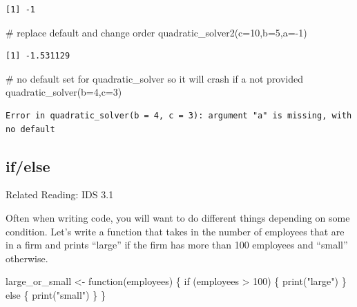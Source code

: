 \documentclass[
  letterpaper,
  DIV=11,
  numbers=noendperiod]{scrreprt}
\newenvironment{Shaded}{\begin{snugshade}}{\end{snugshade}}
\newcommand{\AttributeTok}[1]{\textcolor[rgb]{0.40,0.45,0.13}{#1}}
\newcommand{\CommentTok}[1]{\textcolor[rgb]{0.37,0.37,0.37}{#1}}
\newcommand{\ControlFlowTok}[1]{\textcolor[rgb]{0.00,0.23,0.31}{#1}}
\newcommand{\DecValTok}[1]{\textcolor[rgb]{0.68,0.00,0.00}{#1}}
\newcommand{\FunctionTok}[1]{\textcolor[rgb]{0.28,0.35,0.67}{#1}}
\newcommand{\NormalTok}[1]{\textcolor[rgb]{0.00,0.23,0.31}{#1}}
\newcommand{\OtherTok}[1]{\textcolor[rgb]{0.00,0.23,0.31}{#1}}
\newcommand{\SpecialCharTok}[1]{\textcolor[rgb]{0.37,0.37,0.37}{#1}}
\newcommand{\StringTok}[1]{\textcolor[rgb]{0.13,0.47,0.30}{#1}}
\begin{document}
\begin{verbatim}
[1] -1
\end{verbatim}

\begin{Shaded}
\begin{Highlighting}[]
\CommentTok{\# replace default and change order}
\FunctionTok{quadratic\_solver2}\NormalTok{(}\AttributeTok{c=}\DecValTok{10}\NormalTok{,}\AttributeTok{b=}\DecValTok{5}\NormalTok{,}\AttributeTok{a=}\SpecialCharTok{{-}}\DecValTok{1}\NormalTok{)}
\end{Highlighting}
\end{Shaded}

\begin{verbatim}
[1] -1.531129
\end{verbatim}

\begin{Shaded}
\begin{Highlighting}[]
\CommentTok{\# no default set for quadratic\_solver so it will crash if a not provided}
\FunctionTok{quadratic\_solver}\NormalTok{(}\AttributeTok{b=}\DecValTok{4}\NormalTok{,}\AttributeTok{c=}\DecValTok{3}\NormalTok{)}
\end{Highlighting}
\end{Shaded}

\begin{verbatim}
Error in quadratic_solver(b = 4, c = 3): argument "a" is missing, with no default
\end{verbatim}

\subsection{if/else}\label{ifelse}

Related Reading: IDS 3.1

Often when writing code, you will want to do different things depending
on some condition. Let's write a function that takes in the number of
employees that are in a firm and prints ``large'' if the firm has more
than 100 employees and ``small'' otherwise.

\begin{Shaded}
\begin{Highlighting}[]
\NormalTok{large\_or\_small }\OtherTok{\textless{}{-}} \ControlFlowTok{function}\NormalTok{(employees) \{}
  \ControlFlowTok{if}\NormalTok{ (employees }\SpecialCharTok{\textgreater{}} \DecValTok{100}\NormalTok{) \{}
    \FunctionTok{print}\NormalTok{(}\StringTok{"large"}\NormalTok{)}
\NormalTok{  \} }\ControlFlowTok{else}\NormalTok{ \{}
    \FunctionTok{print}\NormalTok{(}\StringTok{"small"}\NormalTok{)}
\NormalTok{  \}}
\NormalTok{\}}
\end{Highlighting}
\end{Shaded}
\end{document}

